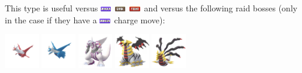 \documentclass[12pt]{beamer}
\newcommand{\fightingfull}{\includegraphics[height=0.2cm]{../../images/type/full/Fighting.png}}
\newcommand{\darkfull}{\includegraphics[height=0.2cm]{../../images/type/full/Dark.png}}
\newcommand{\dragonfull}{\includegraphics[height=0.2cm]{../../images/type/full/Dragon.png}}
\begin{document}
\begin{frame}[label=Fairy]
\begin{footnotesize}
\begin{block}{}\begin{center}
This type is useful versus \dragonfull~\darkfull~\fightingfull~and versus the following raid bosses (only in the case if they have a \dragonfull~charge move):

    \includegraphics[width=1.5cm]{../../images/pokemon/latias.png}
    \includegraphics[width=1.5cm]{../../images/pokemon/latios.png}
    \includegraphics[width=1.5cm]{../../images/pokemon/palkia.png}\quad
    \includegraphics[width=1.5cm]{../../images/pokemon/giratina_a.png}\quad
    \includegraphics[width=1.5cm]{../../images/pokemon/giratina_o.png}
\end{center}
\end{block}

\end{footnotesize}
\end{frame}



\end{document}
